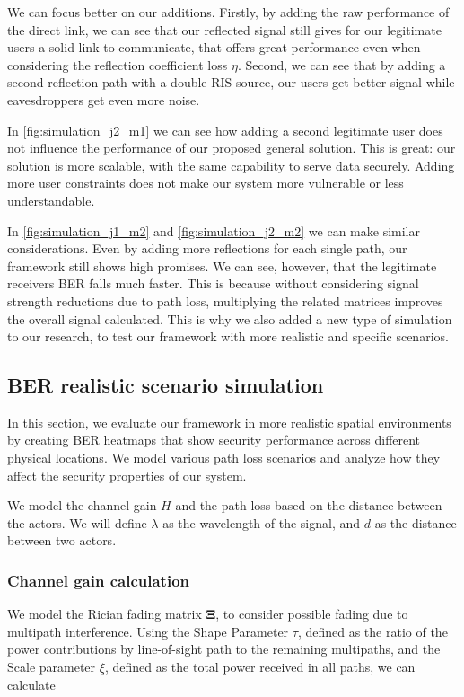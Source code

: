 We can focus better on our additions. Firstly, by adding the raw performance of the direct link, we can see that our reflected signal still gives for our legitimate users a solid link to communicate, that offers great performance even when considering the reflection coefficient loss $\eta$. Second, we can see that by adding a second reflection path with a double RIS source, our users get better signal while eavesdroppers get even more noise.

In \cref{fig:simulation_j2_m1} we can see how adding a second legitimate user does not influence the performance of our proposed general solution. This is great: our solution is more scalable, with the same capability to serve data securely. Adding more user constraints does not make our system more vulnerable or less understandable.

In \cref{fig:simulation_j1_m2} and \cref{fig:simulation_j2_m2} we can make similar considerations. Even by adding more reflections for each single path, our framework still shows high promises. We can see, however, that the legitimate receivers BER falls much faster. This is because without considering signal strength reductions due to path loss, multiplying the related matrices improves the overall signal calculated. This is why we also added a new type of simulation to our research, to test our framework with more realistic and specific scenarios.

\newpage
\subsection{BER realistic scenario simulation}

In this section, we evaluate our framework in more realistic spatial environments by creating BER heatmaps that show security performance across different physical locations. We model various path loss scenarios and analyze how they affect the security properties of our system.

We model the channel gain $H$ and the path loss based on the distance between the actors. We will define $\lambda$ as the wavelength of the signal, and $d$ as the distance between two actors.

\subsubsection{Channel gain calculation}

We model the Rician fading \cite{Rician_fading} matrix $\bm{\Xi}$, to consider possible fading due to multipath interference. Using the Shape Parameter $\tau$, defined as the ratio of the power contributions by line-of-sight path to the remaining multipaths, and the Scale parameter $\xi$, defined as the total power received in all paths, we can calculate

